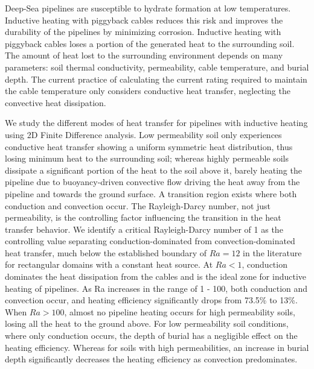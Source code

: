 \documentclass[Journal,letterpaper,InsideFigs]{ascelike-new}
\begin{document}
Deep-Sea pipelines are susceptible to hydrate formation at low temperatures. Inductive heating with piggyback cables reduces this risk and improves the durability of the pipelines by minimizing corrosion. Inductive heating with piggyback cables loses a portion of the generated heat to the surrounding soil. The amount of heat lost to the surrounding environment depends on many parameters: soil thermal conductivity, permeability, cable temperature, and burial depth. The current practice of calculating the current rating required to maintain the cable temperature only considers conductive heat transfer, neglecting the convective heat dissipation. 

We study the different modes of heat transfer for pipelines with inductive heating using 2D Finite Difference analysis. Low permeability soil only experiences conductive heat transfer showing a uniform symmetric heat distribution, thus losing minimum heat to the surrounding soil;  whereas highly permeable soils dissipate a significant portion of the heat to the soil above it, barely heating the pipeline due to buoyancy-driven convective flow driving the heat away from the pipeline and towards the ground surface. A transition region exists where both conduction and convection occur. The Rayleigh-Darcy number, not just permeability, is the controlling factor influencing the transition in the heat transfer behavior. We identify a critical Rayleigh-Darcy number of 1 as the controlling value separating conduction-dominated from convection-dominated heat transfer, much below the established boundary of $Ra = 12$ in the literature for rectangular domains with a constant heat source. At $Ra < 1$, conduction dominates the heat dissipation from the cables and is the ideal zone for inductive heating of pipelines. As Ra increases in the range of 1 - 100, both conduction and convection occur, and heating efficiency significantly drops from 73.5\% to 13\%. When $Ra > 100$, almost no pipeline heating occurs for high permeability soils, losing all the heat to the ground above. For low permeability soil conditions, where only conduction occurs, the depth of burial has a negligible effect on the heating efficiency. Whereas for soils with high permeabilities, an increase in burial depth significantly decreases the heating efficiency as convection predominates.
\pagebreak
%
\appendix
%
\end{document}
